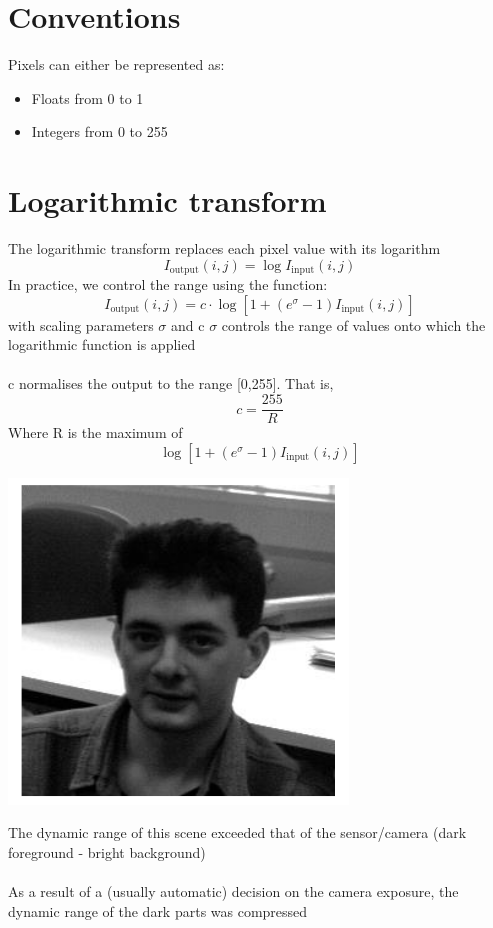 \documentclass{article}[18pt]
\begin{document}
\section{Conventions}
Pixels can either be represented as:
\begin{itemize}
	\item Floats from 0 to 1
	\item Integers from 0 to 255
\end{itemize}
\section{Logarithmic transform}
The logarithmic transform replaces each pixel value with its logarithm
\[
I_{\text {output}}(i, j)=\log I_{\text {input}}(i, j)
\]
In practice, we control the range using the function:
\[
I_{\text {output}}(i, j)=c \cdot \log \left[1+\left(e^{\sigma}-1\right) I_{\text {input}}(i, j)\right]
\]
with scaling parameters $\sigma$ and c
$\sigma$ controls the range of values onto which the logarithmic function is applied\\
\\
c normalises the output to the range [0,255]. That is,
$$c=\dfrac{255}{R}$$
Where R is the maximum of
$$\log \left[1+\left(e^{\sigma}-1\right) I_{\text {input}}(i, j)\right]$$
\begin{center}
	\includegraphics[scale=0.7]{log}
\end{center}
The dynamic range of this scene exceeded that of the sensor/camera (dark foreground - bright background)\\
\\
As a result of a (usually automatic) decision on the camera exposure, the dynamic range of the dark parts was compressed
\end{document}
